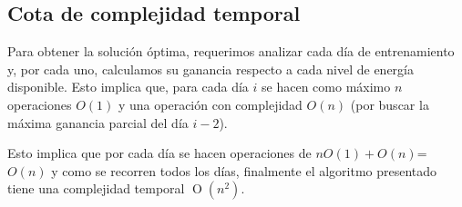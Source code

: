 \subsection{Cota de complejidad temporal}

Para obtener la solución óptima, requerimos analizar cada día de entrenamiento y, por cada uno, 
calculamos su ganancia respecto a cada nivel de energía disponible.
Esto implica que, para cada día $i$ se hacen como máximo $n$ operaciones $O(1)$ y una operación con complejidad $O(n)$ (por buscar
la máxima ganancia parcial del día $i-2$). 

Esto implica que por cada día se hacen operaciones de $nO(1)+O(n)$=$O(n)$ y como se 
recorren todos los días, finalmente el algoritmo presentado tiene una complejidad temporal $\operatorname{O}(n^2)$.
